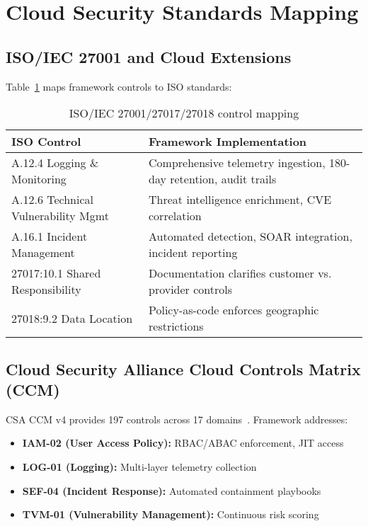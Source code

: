 \section{Cloud Security Standards Mapping}\label{sec:policy-cloud}
\subsection{ISO/IEC 27001 and Cloud Extensions}
Table~\ref{tab:iso-mapping} maps framework controls to ISO standards:

\begin{table}[H]
\centering
\caption{ISO/IEC 27001/27017/27018 control mapping}
\label{tab:iso-mapping}
\begin{tabular}{p{}p{}}
\toprule
\textbf{ISO Control} & \textbf{Framework Implementation} \\
\midrule
A.12.4 Logging \& Monitoring & Comprehensive telemetry ingestion, 180-day retention, audit trails \\
A.12.6 Technical Vulnerability Mgmt & Threat intelligence enrichment, CVE correlation \\
A.16.1 Incident Management & Automated detection, SOAR integration, incident reporting \\
27017:10.1 Shared Responsibility & Documentation clarifies customer vs. provider controls \\
27018:9.2 Data Location & Policy-as-code enforces geographic restrictions \\
\bottomrule
\end{tabular}
\end{table}

\subsection{Cloud Security Alliance Cloud Controls Matrix (CCM)}
CSA CCM v4 provides 197 controls across 17 domains~\cite{csa2023ccm}. Framework addresses:
\begin{itemize}
    \item \textbf{IAM-02 (User Access Policy):} RBAC/ABAC enforcement, JIT access
    \item \textbf{LOG-01 (Logging):} Multi-layer telemetry collection
    \item \textbf{SEF-04 (Incident Response):} Automated containment playbooks
    \item \textbf{TVM-01 (Vulnerability Management):} Continuous risk scoring
\end{itemize}

